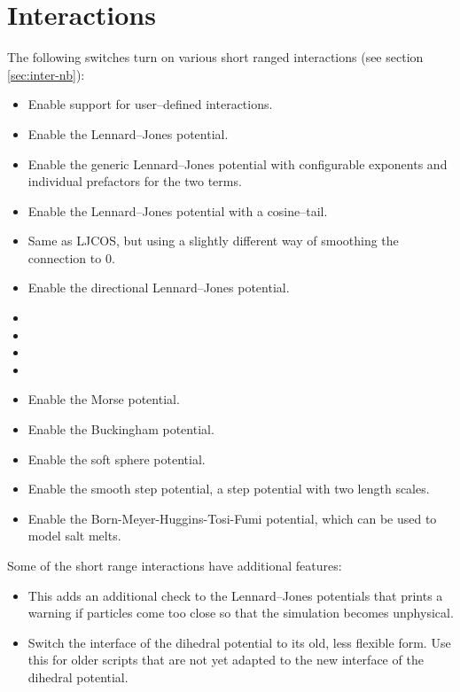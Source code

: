\begin{itemize}
\end{itemize}

\section{Interactions}

The following switches turn on various short ranged interactions (see section
\vref{sec:inter-nb}):
\begin{itemize}
\item {} Enable support for user--defined
  interactions.
\item {} Enable the Lennard--Jones potential.
\item {} Enable the generic
  Lennard--Jones potential with configurable exponents and individual
  prefactors for the two terms.
\item {} Enable the Lennard--Jones potential with a cosine--tail.
\item {} Same as LJCOS, but using a slightly different way of
  smoothing the connection to 0.
\item {} Enable the directional Lennard--Jones potential.
\item {}
\item {}
\item {}
\item {}
\item {} Enable the Morse potential.
\item {} Enable the Buckingham potential.
\item {} Enable the soft sphere potential.
\item {} Enable the smooth step potential, a
  step potential with two length scales.
\item {} Enable the Born-Meyer-Huggins-Tosi-Fumi potential,
  which can be used to model salt melts.
\end{itemize}

Some of the short range interactions have additional features:
\begin{itemize}
\item {} This adds an additional check to
  the Lennard--Jones potentials that prints a warning if particles come
  too close so that the simulation becomes unphysical.
\item {} Switch the interface of the dihedral potential
  to its old, less flexible form. Use this for older scripts that are not yet
  adapted to the new interface of the dihedral potential.
\end{itemize}

